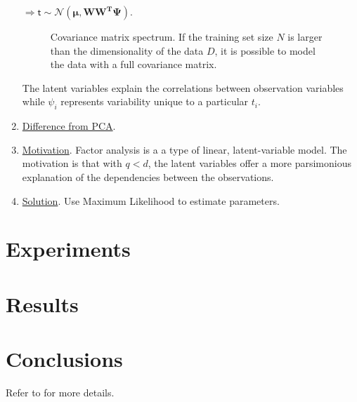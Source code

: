 \begin{enumerate}
$\Rightarrow \mathsf{t}\sim \mathcal{N}(\mathbf{\mu},\mathbf{WW^T\Psi})$.


								\begin{figure}
								\centering
								\caption{Covariance matrix spectrum.  If the training set size $N$ is larger than the dimensionality of the data $D$, it is possible to model the data with a full covariance matrix.} 
								\label{fig:covariance_matrix_spectrum}
								\end{figure}

The latent variables explain the correlations between observation variables while $\psi_i$ represents variability unique to a particular $t_i$.

\item \underline{Difference from PCA}.  

\item \underline{Motivation}.  Factor analysis is a a type of linear, latent-variable model.  The motivation is that with $q<d$, the latent variables offer a more parsimonious explanation of the dependencies between the observations.


\item \underline{Solution}.  Use Maximum Likelihood to estimate parameters.


\end{enumerate}


\section{Experiments}
\section{Results}
\section{Conclusions}
Refer to \cite{1999_JNL_PPCA_Tipping} for more details.


